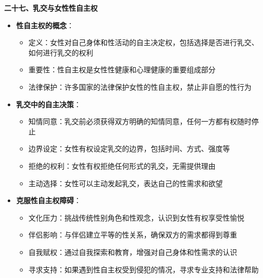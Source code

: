 \documentclass[12pt,UTF8]{ctexbook}
\begin{document}
  \textbf{二十七、乳交与女性性自主权}
  \begin{itemize}
  \item \textbf{性自主权的概念}：
    \begin{itemize}
    \item 定义：女性对自己身体和性活动的自主决定权，包括选择是否进行乳交、如何进行乳交的权利
    \item 重要性：性自主权是女性性健康和心理健康的重要组成部分
    \item 法律保护：许多国家的法律保护女性的性自主权，禁止非自愿的性行为
    \end{itemize}
  \item \textbf{乳交中的自主决策}：
    \begin{itemize}
    \item 知情同意：乳交前必须获得双方明确的知情同意，任何一方都有权随时停止
    \item 边界设定：女性有权设定乳交的边界，包括时间、方式、强度等
    \item 拒绝的权利：女性有权拒绝任何形式的乳交，无需提供理由
    \item 主动选择：女性可以主动发起乳交，表达自己的性需求和欲望
    \end{itemize}
  \item \textbf{克服性自主权障碍}：
    \begin{itemize}
    \item 文化压力：挑战传统性别角色和性观念，认识到女性有权享受性愉悦
    \item 伴侣影响：与伴侣建立平等的性关系，确保双方的需求都得到尊重
    \item 自我赋权：通过自我探索和教育，增强对自己身体和性需求的认识
    \item 寻求支持：如果遇到性自主权受到侵犯的情况，寻求专业支持和法律帮助
    \end{itemize}
  \end{itemize}
\end{document}

